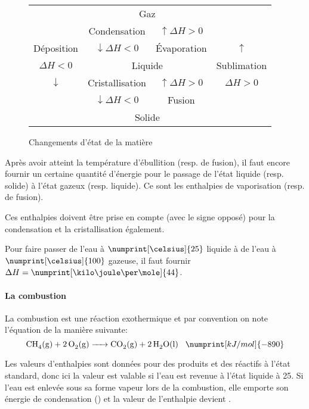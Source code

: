 \begin{figure}[h!]
  \begin{center}
    \begin{tabular}{|c|cc|c|}
      \cline{1-1} \cline{4-4}
      & \multicolumn{2}{c|}{Gaz} & \\
      \cline{2-3}
      \multicolumn{1}{|c}{} & Condensation & \multicolumn{1}{c}{$\uparrow \Delta H > 0$} & \\
      \multicolumn{1}{|c}{Déposition} & $\downarrow \Delta H < 0$ & \multicolumn{1}{c}{\'Evaporation} & $\uparrow$\\
      \cline{2-3}
      $\Delta H < 0$ & \multicolumn{2}{c|}{Liquide} & Sublimation\\
      \cline{2-3}
      \multicolumn{1}{|c}{$\downarrow$} & Cristallisation & \multicolumn{1}{c}{$\uparrow \Delta H > 0$} & $\Delta H > 0$\\
      \multicolumn{1}{|c}{} & $\downarrow \Delta H < 0$ & \multicolumn{1}{c}{Fusion} & \\
      \cline{2-3}
      & \multicolumn{2}{c|}{Solide} &\\
      \cline{1-1} \cline{4-4}
    \end{tabular}
  \end{center}
  \label{fig:state}
  \caption{Changements d'état de la matière}
\end{figure}

Après avoir atteint la température d'ébullition (resp. de fusion),
il faut encore fournir un certaine quantité d'énergie pour le passage de l'état liquide (resp. solide) à l'état gazeux (resp. liquide).
Ce sont les enthalpies de vaporisation (resp. de fusion).

Ces enthalpies doivent être prise en compte (avec le signe opposé) pour la condensation et la cristallisation également.

Pour faire passer de l'eau à $\numprint[\celsius]{25}$ liquide à de l'eau à $\numprint[\celsius]{100}$ gazeuse,
il faut fournir $\Delta H = \numprint[\kilo\joule\per\mole]{44}$.

\paragraph{La combustion}
La combustion est une réaction exothermique et par convention on note l'équation de la manière suivante:
$$\ce{CH4(g) + 2O2(g) -> CO2(g) + 2H2O(l)}\hspace{3mm}\numprint[kJ/mol]{-890}$$

Les valeurs d'enthalpies sont données pour des produits et des réactifs à l'état standard,
donc ici la valeur   est valable si l'eau est revenue à l'état liquide à 25\celsius.
Si l'eau est enlevée sous sa forme vapeur lors de la combustion,
elle emporte son énergie de condensation () et la valeur de l'enthalpie devient .

